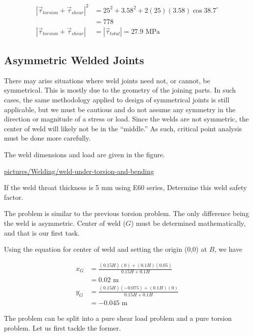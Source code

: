 \documentclass[a4paper,openany,nobib]{tufte-book}
\begin{document}
{{$$\begin{aligned}
    \left| \vec{\tau}_{torsion} + \vec{\tau}_{shear} \right|^2 &= 25^2 + 3.58^2 + 2(25)(3.58) \cos 38.7^{\circ} \\
                                                               &= 778 \\
    \left| \vec{\tau}_{torsion} + \vec{\tau}_{shear} \right| &= \left| \vec{\tau}_{total} \right| = 27.9 \text{ MPa}                                                        
  \end{aligned}$$

\subsection{Asymmetric Welded Joints}
\label{asymmetric-welded-joints}
There may arise situations where weld joints need not, or cannot, be
symmetrical. This is mostly due to the geometry of the joining parts. In
such cases, the same methodology applied to design of symmetrical joints
is still applicable, but we must be cautious and do not assume any
symmetry in the direction or magnitude of a stress or load. Since the
welds are not symmetric, the center of weld will likely not be in the
``middle.'' As such, critical point analysis must be done more carefully.

The weld dimensions and load are given in the figure.

\url{pictures/Welding/weld-under-torsion-and-bending}

If the weld throat thickness is 5 mm using E60 series, Determine this
weld safety factor.

The problem is similar to the previous torsion problem. The only
difference being the weld is asymmetric. Center of weld (\(G\)) must be
determined mathematically, and that is our first task.

Using the equation for center of weld and setting the origin (0,0) at
\(B\), we have

$$\begin{aligned}
    x_G &= \frac{(0.15H)(0) + (0.1H)(0.05)}{ 0.15H + 0.1H } \\
        &= 0.02 \text{ m} \\
    y_G &= \frac{(0.15H)(-0.075) + (0.1H)(0)}{ 0.15H + 0.1H } \\
        &= -0.045 \text{ m} 
  \end{aligned}$$

The problem can be split into a pure shear load problem and a pure
torsion problem. Let us first tackle the former.

}}
\end{document}
